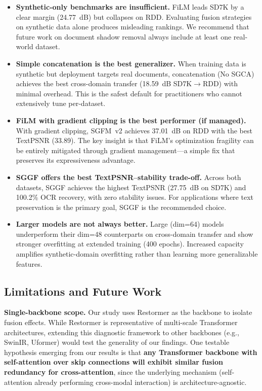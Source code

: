 \documentclass[11pt]{article}
\begin{document}
\begin{itemize}
  \item \textbf{Synthetic-only benchmarks are insufficient.} FiLM leads SD7K by a clear margin (24.77~dB) but collapses on RDD. Evaluating fusion strategies on synthetic data alone produces misleading rankings. We recommend that future work on document shadow removal always include at least one real-world dataset.
  \item \textbf{Simple concatenation is the best generalizer.} When training data is synthetic but deployment targets real documents, concatenation (No SGCA) achieves the best cross-domain transfer (18.59~dB SD7K$\rightarrow$RDD) with minimal overhead. This is the safest default for practitioners who cannot extensively tune per-dataset.
  \item \textbf{FiLM with gradient clipping is the best performer (if managed).} With gradient clipping, SGFM~v2 achieves 37.01~dB on RDD with the best TextPSNR (33.89). The key insight is that FiLM's optimization fragility can be entirely mitigated through gradient management---a simple fix that preserves its expressiveness advantage.
  \item \textbf{SGGF offers the best TextPSNR--stability trade-off.} Across both datasets, SGGF achieves the highest TextPSNR (27.75~dB on SD7K) and 100.2\% OCR recovery, with zero stability issues. For applications where text preservation is the primary goal, SGGF is the recommended choice.
  \item \textbf{Larger models are not always better.} Large (dim=64) models underperform their dim=48 counterparts on cross-domain transfer and show stronger overfitting at extended training (400 epochs). Increased capacity amplifies synthetic-domain overfitting rather than learning more generalizable features.
\end{itemize}

\subsection{Limitations and Future Work}

\textbf{Single-backbone scope.} Our study uses Restormer as the backbone to isolate fusion effects. While Restormer is representative of multi-scale Transformer architectures, extending this diagnostic framework to other backbones (e.g., SwinIR, Uformer) would test the generality of our findings.
One testable hypothesis emerging from our results is that \textbf{any Transformer backbone with self-attention over skip connections will exhibit similar fusion redundancy for cross-attention}, since the underlying mechanism (self-attention already performing cross-modal interaction) is architecture-agnostic.
\end{document}
